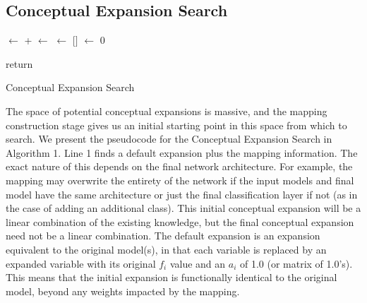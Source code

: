 \documentclass[letterpaper]{article}
\begin{document}
\subsection{Conceptual Expansion Search}
\label{ref:ce}
\IncMargin{1em}
\begin{algorithm}[tb]
\footnotesize
{}

\BlankLine

\MaxExpansion$\leftarrow$ \GetDefaultExpansion{\Model}+\Mapping\;
\MaxScore$\leftarrow$ \Score\;
\Visited$\leftarrow$ $[$\MaxExpansion$]$\;
\Improving$\leftarrow$ 0\;


return \MaxExpansion\;
\caption{Conceptual Expansion Search}\label{algo_conceptualExpansionSearch}
\end{algorithm}\DecMargin{1em}
\normalsize

The space of potential conceptual expansions is massive, and the mapping construction stage gives us an initial starting point in this space from which to search. We present the pseudocode for the Conceptual Expansion Search in Algorithm 1. Line 1 finds a default expansion plus the mapping information. The exact nature of this depends on the final network architecture. For example, the mapping may overwrite the entirety of the network if the input models and final model have the same architecture or just the final classification layer if not (as in the case of adding an additional class). 
This initial conceptual expansion will be a linear combination of the existing knowledge, but the final conceptual expansion need not be a linear combination. 
The default expansion is an expansion equivalent to the original model(s), in that each variable is replaced by an expanded variable with its original $f_i$ value and an $a_i$ of 1.0 (or matrix of 1.0's). This means that the initial expansion is functionally identical to the original model, beyond any weights impacted by the mapping. 
\end{document}
